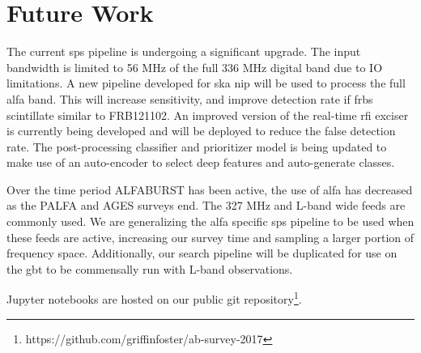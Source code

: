 \documentclass[a4paper,fleqn,usenatbib]{mnras}
\begin{document}
\section{Future Work}
\label{sec:future_work}

The current \gls*{sps} pipeline is undergoing a significant upgrade. The input
bandwidth is limited to 56 MHz of the full 336 MHz digital band due to IO
limitations. A new pipeline developed for \gls*{ska} \gls*{nip} will be used to
process the full \gls*{alfa} band. This will increase sensitivity, and improve
detection rate if \glspl*{frb} scintillate similar to FRB121102. An improved
version of the real-time \gls*{rfi} exciser is currently being developed and
will be deployed to reduce the false detection rate. The post-processing
classifier and prioritizer model is being updated to make use of an auto-encoder
to select deep features and auto-generate classes.

Over the time period ALFABURST has been active, the use of \gls*{alfa} has
decreased as the PALFA and AGES surveys end. The 327 MHz and L-band wide feeds
are commonly used. We are generalizing the \gls*{alfa} specific \gls*{sps}
pipeline to be used when these feeds are active, increasing our survey time and
sampling a larger portion of frequency space. Additionally, our search pipeline
will be duplicated for use on the \gls*{gbt} to be commensally run with L-band
observations. 

Jupyter notebooks are hosted on our public git
repository\footnote{https://github.com/griffinfoster/ab-survey-2017}.


 

\bsp	%
\label{lastpage}
\end{document}

